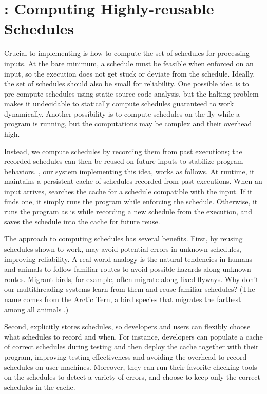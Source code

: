 

\chapter{\tern: Computing Highly-reusable Schedules} \label{sec:tern}


Crucial to implementing \smt is how to compute the set of schedules for
processing inputs.  At the bare minimum, a schedule must be feasible when
enforced on an input, so the execution does not get stuck or deviate from
the schedule.  Ideally, the set of schedules should also be small for
reliability.  One possible idea is to pre-compute schedules using static
source code analysis, but the halting problem makes it undecidable to
statically compute schedules guaranteed to work dynamically.  Another
possibility is to compute schedules on the fly while a program is running,
but the computations may be complex and their overhead high.

Instead, we compute schedules by recording them from past executions; the
recorded schedules can then be reused on future inputs to stabilize
program behaviors.  \tern, our system implementing this idea, works as
follows.  At runtime, it maintains a persistent cache of schedules
recorded from past executions.  When an input arrives, \tern searches the
cache for a schedule compatible with the input.  If it finds one, it
simply runs the program while enforcing the schedule.  Otherwise, it runs
the program as is while recording a new schedule from the execution, and
saves the schedule into the cache for future reuse.

The \tern approach to computing schedules has several benefits. First, by
reusing schedules shown to work, \tern may avoid potential errors in
unknown schedules, improving reliability.  A real-world analogy is the
natural tendencies in humans and animals to follow familiar routes to
avoid possible hazards along unknown routes.  Migrant birds, for example,
often migrate along fixed flyways.  Why don't our multithreading systems
learn from them and reuse familiar schedules?  (The name \tern comes from
the Arctic Tern, a bird species that migrates the farthest among all
animals%
.)

Second, \tern explicitly stores schedules, so developers and users can
flexibly choose what schedules to record and when.  For instance,
developers can populate a cache of correct schedules during testing and
then deploy the cache together with their program, improving testing
effectiveness and avoiding the overhead to record schedules on user
machines.  Moreover, they can run their favorite checking tools on the
schedules to detect a variety of errors, and choose to keep only the
correct schedules in the cache.

